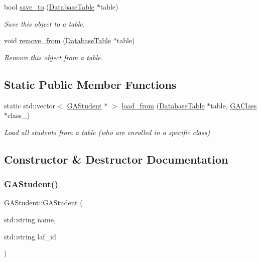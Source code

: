 \begin{DoxyCompactItemize}
bool \hyperlink{class_g_a_student_a752f52729e51c7b3b31d86a3e812088b}{save\+\_\+to} (\hyperlink{class_database_table}{Database\+Table} $\ast$table)
\begin{DoxyCompactList}\small\item\em Save this object to a table. \end{DoxyCompactList}\item 
void \hyperlink{class_g_a_student_a35c859da932a8a83f5622bcd46ae1269}{remove\+\_\+from} (\hyperlink{class_database_table}{Database\+Table} $\ast$table)
\begin{DoxyCompactList}\small\item\em Remove this object from a table. \end{DoxyCompactList}\end{DoxyCompactItemize}
\subsection*{Static Public Member Functions}
\begin{DoxyCompactItemize}
\item 
static std\+::vector$<$ \hyperlink{class_g_a_student}{G\+A\+Student} $\ast$ $>$ \hyperlink{class_g_a_student_a7b95740499af16d32f2b12ec2508ee7e}{load\+\_\+from} (\hyperlink{class_database_table}{Database\+Table} $\ast$table, \hyperlink{class_g_a_class}{G\+A\+Class} $\ast$class\+\_\+)
\begin{DoxyCompactList}\small\item\em Load all students from a table (who are enrolled in a specific class) \end{DoxyCompactList}\end{DoxyCompactItemize}


\subsection{Constructor \& Destructor Documentation}
\mbox{\label{class_g_a_student_a83c98a132e18c6f630028f3ee4e94fb2}} 
\subsubsection{\texorpdfstring{G\+A\+Student()}{GAStudent()}\hspace{0.1cm}{\footnotesize\ttfamily [1/2]}}
{\footnotesize\ttfamily G\+A\+Student\+::\+G\+A\+Student (\begin{DoxyParamCaption}\item[{std\+::string}]{name,  }\item[{std\+::string}]{laf\+\_\+id }\end{DoxyParamCaption})}



